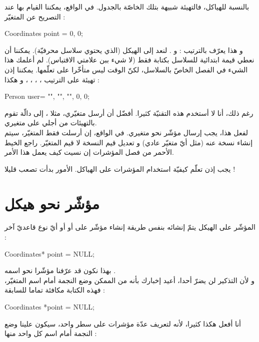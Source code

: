 بالنسبة للهياكل، فالتهيئة شبيهة بتلك الخاصّة بالجدول. في الواقع، يمكننا القيام بها عند التصريح عن المتغيّر :

\begin{Csource}
Coordinates point = {0, 0};
\end{Csource}

و هذا يعرّف بالترتيب :
و
.
لنعد إلى الهيكل
(الذي يحتوي سلاسل محرفيّة). يمكننا أن نعطي قيمة ابتدائية للسلاسل بكتابة فقط
(لا شيء ببن علامتي الاقتباس). لم أعلمك هذا الشيء في الفصل الخاصّ بالسلاسل، لكنّ الوقت ليس متأخّرا على تعلّمها.
يمكننا إذن تهيئة على الترتيب
،
،
،
،
و
هكذا :

\begin{Csource}
Person user= {"", "", "", 0, 0};
\end{Csource}

رغم ذلك، أنا لا أستخدم هذه التقنيّة كثيرا. أفضّل أن أرسل متغيّري، مثلا
،
إلى دالّة
تقوم بالتهيئات من أجلي على متغيري.\\
لفعل هذا، يجب إرسال مؤشّر نحو متغيري. في الواقع، إن أرسلت فقط المتغيّر، سيتم إنشاء نسخة عنه (مثل أيّ متغيّر عادي) و تعديل قيم النسخة لا قيم المتغيّر. راجع الخيط الأحمر من فصل المؤشرات إن نسيت كيف يعمل هذا الأمر.

يجب إذن تعلّم كيفيّة استخدام المؤشرات على الهياكل. الأمور بدأت تصعب قليلا !

\section{مؤشّر نحو هيكل}

المؤشّر على الهيكل يتمّ إنشائه بنفس طريقة إنشاء مؤشّر على
أو
أو أيّ نوع قاعديّ آخر :

\begin{Csource}
Coordinates* point = NULL;
\end{Csource}
بهذا نكون قد عرّفنا مؤشّرا نحو
اسمه
.\\
و لأن التذكير لن يضرّ أحدا، أعيد إخبارك بأنه من الممكن وضع النجمة أمام اسم المتغيّر، فهذه الكتابة مكافئة تماما للسابقة :

\begin{Csource}
Coordinates *point = NULL;
\end{Csource}

أنا أفعل هكذا كثيرا، لأنه لتعريف عدّة مؤشرات على سطر واحد، سيكون علينا وضع النجمة أمام اسم كل واحد منها :


